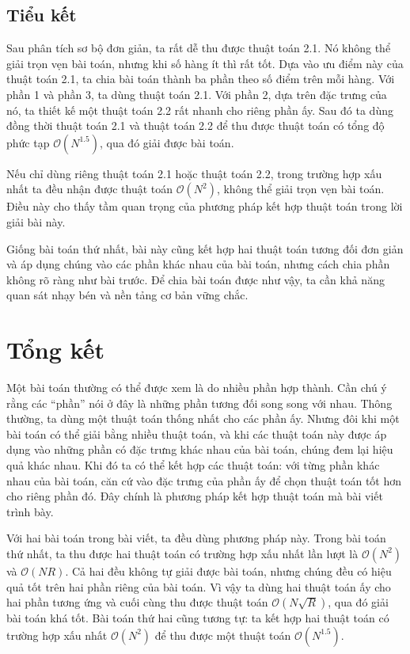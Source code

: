 \documentclass[11pt]{article}
\newcommand{\Oh}{\mathcal{O}}
\begin{document}
\subsection{Tiểu kết}

Sau phân tích sơ bộ đơn giản, ta rất dễ thu được thuật toán 2.1. Nó không thể
giải trọn vẹn bài toán, nhưng khi số hàng ít thì rất tốt. Dựa vào ưu điểm này
của thuật toán 2.1, ta chia bài toán thành ba phần theo số điểm trên mỗi
hàng. Với phần 1 và phần 3, ta dùng thuật toán 2.1. Với phần 2, dựa trên đặc
trưng của nó, ta thiết kế một thuật toán 2.2 rất nhanh cho riêng phần ấy. Sau
đó ta dùng đồng thời thuật toán 2.1 và thuật toán 2.2 để thu được thuật toán
có tổng độ phức tạp $\Oh(N^{1.5})$, qua đó giải được bài toán.

Nếu chỉ dùng riêng thuật toán 2.1 hoặc thuật toán 2.2, trong trường hợp xấu
nhất ta đều nhận được thuật toán $\Oh(N^2)$, không thể giải trọn vẹn bài toán.
Điều này cho thấy tầm quan trọng của phương pháp kết hợp thuật toán trong lời
giải bài này.

Giống bài toán thứ nhất, bài này cũng kết hợp hai thuật toán tương đối đơn
giản và áp dụng chúng vào các phần khác nhau của bài toán, nhưng cách chia
phần không rõ ràng như bài trước. Để chia bài toán được như vậy, ta cần khả
năng quan sát nhạy bén và nền tảng cơ bản vững chắc.

\section{Tổng kết}

Một bài toán thường có thể được xem là do nhiều phần hợp thành. Cần chú ý rằng
các ``phần'' nói ở đây là những phần tương đối song song với nhau. Thông
thường, ta dùng một thuật toán thống nhất cho các phần ấy. Nhưng đôi khi một
bài toán có thể giải bằng nhiều thuật toán, và khi các thuật toán này được áp
dụng vào những phần có đặc trưng khác nhau của bài toán, chúng đem lại hiệu
quả khác nhau. Khi đó ta có thể kết hợp các thuật toán: với từng phần khác
nhau của bài toán, căn cứ vào đặc trưng của phần ấy để chọn thuật toán tốt hơn
cho riêng phần đó. Đây chính là phương pháp kết hợp thuật toán mà bài viết
trình bày.

Với hai bài toán trong bài viết, ta đều dùng phương pháp này. Trong bài toán
thứ nhất, ta thu được hai thuật toán có trường hợp xấu nhất lần lượt là
$\Oh(N^2)$ và $\Oh(NR)$. Cả hai đều không tự giải được bài toán, nhưng chúng
đều có hiệu quả tốt trên hai phần riêng của bài toán. Vì vậy ta dùng hai
thuật toán ấy cho hai phần tương ứng và cuối cùng thu được thuật toán
$\Oh(N\sqrt{R})$, qua đó giải bài toán khá tốt. Bài toán thứ hai cũng tương
tự: ta kết hợp hai thuật toán có trường hợp xấu nhất $\Oh(N^2)$ để thu được
một thuật toán $\Oh(N^{1.5})$.
\end{document}
